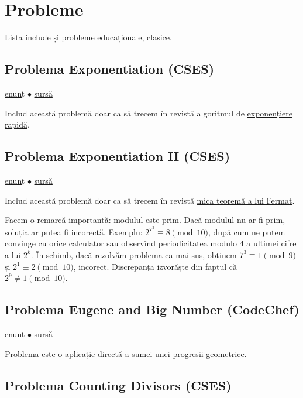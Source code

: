 \documentclass[../main.tex]{subfiles}
\begin{document}
\section{Probleme}

Lista include și probleme educaționale, clasice.

\subsection{Problema Exponentiation (CSES)}
\label{problem:exponentiation}

\href{https://cses.fi/problemset/task/1095}{enunț}
$\bullet$
\hyperref[code:exponentiation]{sursă}

Includ această problemă doar ca să trecem în revistă algoritmul de \href{https://en.wikipedia.org/wiki/Exponentiation_by_squaring}{exponențiere rapidă}.


\subsection{Problema Exponentiation II (CSES)}
\label{problem:exponentiation-2}

\href{https://cses.fi/problemset/task/1712}{enunț}
$\bullet$
\hyperref[code:exponentiation-2]{sursă}

Includ această problemă doar ca să trecem în revistă \href{https://en.wikipedia.org/wiki/Fermat's_little_theorem}{mica teoremă a lui Fermat}.

Facem o remarcă importantă: modulul este prim. Dacă modulul nu ar fi prim, soluția ar putea fi incorectă. Exemplu: $2^{7^3} \equiv 8 \pmod{10}$, după cum ne putem convinge cu orice calculator sau observînd periodicitatea modulo $4$ a ultimei cifre a lui $2^k$. În schimb, dacă rezolvăm problema ca mai sus, obținem $7^3 \equiv 1 \pmod{9}$ și $2^1 \equiv 2 \pmod{10}$, incorect. Discrepanța izvorăște din faptul că $2^9 \neq 1 \pmod{10}$.


\subsection{Problema Eugene and Big Number (CodeChef)}
\label{problem:eugene-and-big-number}

\href{https://www.codechef.com/problems/KBIGNUMB}{enunț}
$\bullet$
\hyperref[code:eugene-and-big-number]{sursă}

Problema este o aplicație directă a sumei unei progresii geometrice.


\subsection{Problema Counting Divisors (CSES)}
\label{problem:counting-divisors}
\end{document}

